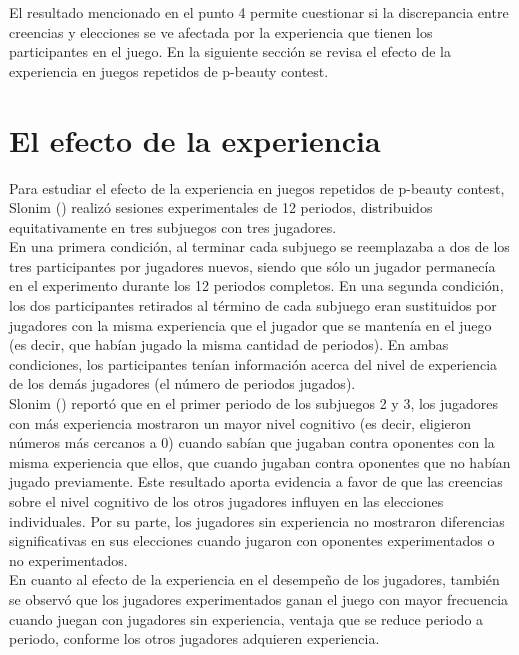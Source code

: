 El resultado mencionado en el punto 4 permite cuestionar si la discrepancia entre creencias y elecciones se ve afectada por la experiencia que tienen los participantes en el juego.  En la siguiente sección se revisa el efecto de la experiencia en juegos repetidos de p-beauty contest.\\

\section{El efecto de la experiencia}

Para estudiar el efecto de la experiencia en juegos repetidos de p-beauty contest, Slonim (\citeyear{Slonim}) realizó sesiones experimentales de 12 periodos, distribuidos equitativamente en tres subjuegos con tres jugadores.\\

En una primera condición, al terminar cada subjuego se reemplazaba a dos de los tres participantes por jugadores nuevos, siendo que sólo un jugador permanecía en el experimento durante los 12 periodos completos. En una segunda condición, los dos participantes retirados al término de cada subjuego eran sustituidos por jugadores con la misma experiencia que el jugador que se mantenía en el juego (es decir, que habían jugado la misma cantidad de periodos). En ambas condiciones, los participantes tenían información acerca del nivel de experiencia de los demás jugadores (el número de periodos jugados).\\

Slonim (\citeyear{Slonim}) reportó que en el primer periodo de los subjuegos 2 y 3, los jugadores con más experiencia mostraron un mayor nivel cognitivo (es decir, eligieron números más cercanos a 0) cuando sabían que jugaban contra oponentes con la misma experiencia que ellos, que cuando jugaban contra oponentes que no habían jugado previamente. Este resultado aporta evidencia a favor de que las creencias sobre el nivel cognitivo de los otros jugadores influyen en las elecciones individuales. Por su parte, los jugadores sin experiencia no mostraron diferencias signiﬁcativas en sus elecciones cuando jugaron con oponentes experimentados o no experimentados.\\

En cuanto al efecto de la experiencia en el desempeño de los jugadores, también se observó que los jugadores experimentados ganan el juego con mayor frecuencia cuando juegan con jugadores sin experiencia, ventaja que se reduce periodo a periodo, conforme los otros jugadores adquieren experiencia.\\

